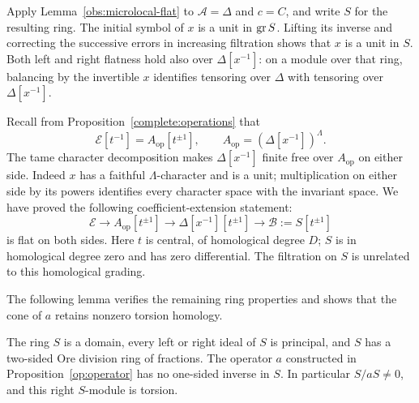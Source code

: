 Apply Lemma~\ref{obs:microlocal-flat} to $\mathcal A=\Delta$ and
$c=C$, and write $S$ for the resulting ring.  The initial symbol of
$x$ is a unit in $\operatorname{gr} S$.  Lifting its inverse and correcting the
successive errors in increasing filtration shows that $x$ is a unit
in $S$.  Both left and right flatness hold also over $\Delta[x^{-1}]$:
on a module over that ring, balancing by the invertible $x$ identifies
tensoring over $\Delta$ with tensoring over $\Delta[x^{-1}]$.

Recall from Proposition~\ref{complete:operations} that
\[
 \mathscr E[t^{-1}]=A_{\mathrm{op}}[t^{\pm1}],
 \qquad A_{\mathrm{op}}=(\Delta[x^{-1}])^\Lambda.
\]
The tame character decomposition makes $\Delta[x^{-1}]$ finite free
over $A_{\mathrm{op}}$ on either side.  Indeed $x$ has a faithful
$\Lambda$-character and is a unit; multiplication on either side
by its powers identifies every character space with the invariant
space.  We have proved the following coefficient-extension statement:
\begin{equation}
\label{obs:coefficient-extension}
 \mathscr E\longrightarrow
 A_{\mathrm{op}}[t^{\pm1}]
 \longrightarrow\Delta[x^{-1}][t^{\pm1}]
 \longrightarrow\mathscr B:=S[t^{\pm1}]
\end{equation}
is flat on both sides.  Here $t$ is central, of homological degree $D$;
$S$ is in homological degree zero and has zero differential.
The filtration on $S$ is unrelated to this homological grading.

The following lemma verifies the remaining ring properties and
shows that the cone of $a$ retains nonzero torsion homology.

\begin{lemma}
\label{obs:principal}
The ring $S$ is a domain, every left or right ideal of $S$ is principal,
and $S$ has a two-sided Ore division ring of fractions.  The operator
$a$ constructed in Proposition~\ref{op:operator} has no one-sided inverse
in $S$.  In particular $S/aS\ne0$, and this right $S$-module is torsion.
\end{lemma}


